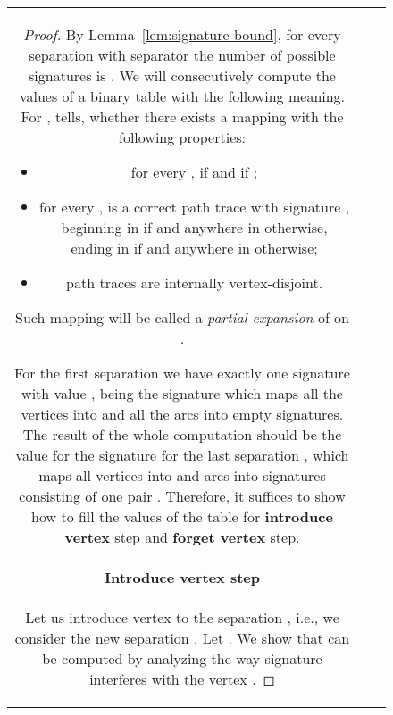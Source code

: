 \documentclass[a4paper,10pt]{article}
\begin{document}
\begin{figure}
\begin{centering}
\begin{tabular}{| c | c | c |}
\begin{proof}
By Lemma~\ref{lem:signature-bound}, for every separation  with separator  the number of possible signatures is . We will consecutively compute the values of a binary table  with the  following meaning. For ,  tells, whether there exists a mapping  with the following properties:
\begin{itemize}
\item for every ,  if  and  if ;
\item for every ,  is a correct path trace with signature , beginning in  if  and anywhere in  otherwise, ending in  if  and anywhere in  otherwise;
\item path traces  are internally vertex-disjoint.
\end{itemize}
Such mapping  will be called a {\emph{partial expansion}} of  on .

For the first separation  we have exactly one signature with value , being the signature which maps all the vertices into  and all the arcs into empty signatures. The result of the whole computation should be the value for the signature for the last separation , which maps all vertices into  and arcs into signatures consisting of one pair . Therefore, it suffices to show how to fill the values of the table for {\bf{introduce vertex}} step and {\bf{forget vertex}} step.

\paragraph*{Introduce vertex step}

Let us introduce vertex  to the separation , i.e., we consider the new separation . Let . We show that  can be computed by analyzing the way signature  interferes with the vertex .


\end{proof}
\end{tabular}
\end{centering}
\end{figure}
\end{document}
